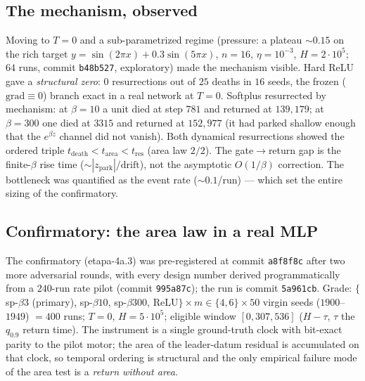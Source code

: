 \documentclass[11pt]{article}
\begin{document}
\subsection{The mechanism, observed}\label{sec:mecanismo}

Moving to $T=0$ and a sub-parametrized regime (pressure: a plateau
$\sim0.15$ on the rich target $y=\sin(2\pi x)+0.3\sin(5\pi x)$, $n=16$,
$\eta=10^{-3}$, $H=2\cdot10^5$; $64$ runs, commit \texttt{b48b527}, exploratory)
made the mechanism visible. Hard ReLU gave a \emph{structural zero}: $0$
resurrections out of $25$ deaths in $16$ seeds, the frozen ($\mathrm{grad}\equiv0$)
branch exact in a real network at $T=0$. Softplus resurrected by mechanism: at
$\beta=10$ a unit died at step $781$ and returned at $139{,}179$; at $\beta=300$
one died at $3315$ and returned at $152{,}977$ (it had parked shallow enough that
the $e^{\beta z}$ channel did not vanish). Both dynamical resurrections showed the
ordered triple $t_{\mathrm{death}}<t_{\mathrm{area}}<t_{\mathrm{res}}$ (area law
$2/2$). The gate$\to$return gap is the finite-$\beta$ rise time
($\sim|z_{\mathrm{park}}|/\mathrm{drift}$), not the asymptotic $O(1/\beta)$
correction. The bottleneck was quantified as the event rate ($\sim0.1$/run) ---
which set the entire sizing of the confirmatory.

\subsection{Confirmatory: the area law in a real MLP}\label{sec:confirm}

The confirmatory (etapa-4a.3) was pre-registered at commit \texttt{a8f8f8c} after
two more adversarial rounds, with every design number derived programmatically
from a $240$-run rate pilot (commit \texttt{995a87c}); the run is commit
\texttt{5a961cb}. Grade: $\{$sp-$\beta3$ (primary), sp-$\beta10$, sp-$\beta300$,
ReLU$\}\times m\in\{4,6\}\times50$ virgin seeds ($1900$--$1949$) $=400$ runs;
$T=0$, $H=5\cdot10^5$; eligible window $[0,307{,}536]$ ($H-\tau$, $\tau$ the
$q_{0.9}$ return time). The instrument is a single ground-truth clock with
bit-exact parity to the pilot motor; the area of the leader-datum residual is
accumulated on that clock, so temporal ordering is structural and the only
empirical failure mode of the area test is a \emph{return without area}.
\end{document}
